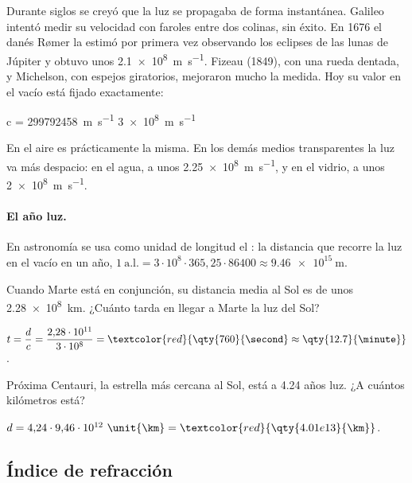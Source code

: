 Durante siglos se creyó que la luz se propagaba de forma instantánea. Galileo intentó medir su velocidad con faroles
entre dos colinas, sin éxito. En 1676 el danés Rømer la estimó por primera vez observando los eclipses de las lunas de
Júpiter y obtuvo unos \qty{2.1e8}{\m\per\second}. Fizeau (1849), con una rueda dentada, y Michelson, con espejos giratorios,
mejoraron mucho la medida. Hoy su valor en el vacío está fijado exactamente:
\begin{centeredequation}
    c = \qty{299792458}{\m\per\second} \approx \qty{3e8}{\m\per\second} \label{eq:opt-c}
\end{centeredequation}
En el aire es prácticamente la misma. En los demás medios transparentes la luz va más despacio: en el agua, a unos
\qty{2.25e8}{\m\per\second}, y en el vidrio, a unos \qty{2e8}{\m\per\second}.

\paragraph{El año luz.} En astronomía se usa como unidad de longitud el : la distancia que recorre la luz en
el vacío en un año, \(\qty{1}{\text{a.l.}} = 3\cdot 10^8\cdot 365{,}25\cdot 86400 \approx \qty{9.46e15}{\m}\).

\begin{exercise}
    Cuando Marte está en conjunción, su distancia media al Sol es de unos \qty{2.28e8}{\km}. ¿Cuánto tarda en llegar a Marte
    la luz del Sol?
    \begin{solu}
        \(t = \dfrac{d}{c} = \dfrac{2{,}28\cdot 10^{11}}{3\cdot 10^8} = \textcolor{red}{\qty{760}{\second} \approx \qty{12.7}{\minute}}\).
    \end{solu}
\end{exercise}

\begin{exercise}
    Próxima Centauri, la estrella más cercana al Sol, está a \num{4.24} años luz. ¿A cuántos kilómetros está?
    \begin{solu}
        \(d = 4{,}24\cdot 9{,}46\cdot 10^{12}\ \unit{\km} = \textcolor{red}{\qty{4.01e13}{\km}}\).
    \end{solu}
\end{exercise}

\subsection{Índice de refracción}\label{subsec:opt-indice}


